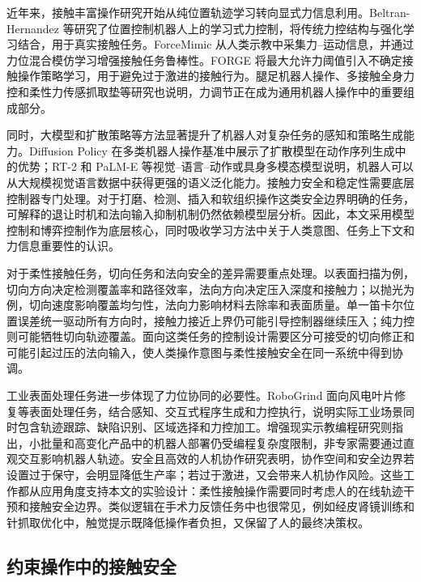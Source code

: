 近年来，接触丰富操作研究开始从纯位置轨迹学习转向显式力信息利用。Beltran-Hernandez 等研究了位置控制机器人上的学习式力控制，将传统力控结构与强化学习结合，用于真实接触任务\cite{beltran2020learning}。ForceMimic 从人类示教中采集力--运动信息，并通过力位混合模仿学习增强接触任务鲁棒性\cite{liu2024forcemimic}。FORGE 将最大允许力阈值引入不确定接触操作策略学习，用于避免过于激进的接触行为\cite{noseworthy2024forge}。腿足机器人操作、多接触全身力控和柔性力传感抓取垫等研究也说明，力调节正在成为通用机器人操作中的重要组成部分\cite{portela2024learning,rouxel2023seiko,han2024grippingpads}。

同时，大模型和扩散策略等方法显著提升了机器人对复杂任务的感知和策略生成能力。Diffusion Policy 在多类机器人操作基准中展示了扩散模型在动作序列生成中的优势\cite{chi2023diffusion}；RT-2 和 PaLM-E 等视觉--语言--动作或具身多模态模型说明，机器人可以从大规模视觉语言数据中获得更强的语义泛化能力\cite{brohan2023rt2,driess2023palme}。接触力安全和稳定性需要底层控制器专门处理。对于打磨、检测、插入和软组织操作这类安全边界明确的任务，可解释的退让时机和法向输入抑制机制仍然依赖模型层分析。因此，本文采用模型控制和博弈控制作为底层核心，同时吸收学习方法中关于人类意图、任务上下文和力信息重要性的认识。

对于柔性接触任务，切向任务和法向安全的差异需要重点处理。以表面扫描为例，切向方向决定检测覆盖率和路径效率，法向方向决定压入深度和接触力；以抛光为例，切向速度影响覆盖均匀性，法向力影响材料去除率和表面质量。单一笛卡尔位置误差统一驱动所有方向时，接触力接近上界仍可能引导控制器继续压入；纯力控则可能牺牲切向轨迹覆盖。面向这类任务的控制设计需要区分可接受的切向修正和可能引起过压的法向输入，使人类操作意图与柔性接触安全在同一系统中得到协调。


工业表面处理任务进一步体现了力位协同的必要性。RoboGrind 面向风电叶片修复等表面处理任务，结合感知、交互式程序生成和力控执行，说明实际工业场景同时包含轨迹跟踪、缺陷识别、区域选择和力控加工\cite{alt2024robogrind}。增强现实示教编程研究则指出，小批量和高变化产品中的机器人部署仍受编程复杂度限制，非专家需要通过直观交互影响机器人轨迹\cite{dogangun2025rampa}。安全且高效的人机协作研究表明，协作空间和安全边界若设置过于保守，会明显降低生产率；若过于激进，又会带来人机协作风险\cite{kamezaki2024dynamicworkspace}。这些工作都从应用角度支持本文的实验设计：柔性接触操作需要同时考虑人的在线轨迹干预和接触安全边界。类似逻辑在手术力反馈任务中也很常见，例如经皮肾镜训练和针抓取优化中，触觉提示既降低操作者负担，又保留了人的最终决策权\cite{wilz2021pcnlhaptic,selvaggio2019hapticneedle}。

\subsection{约束操作中的接触安全}
\label{subsec:ch1_surgical_industrial}

